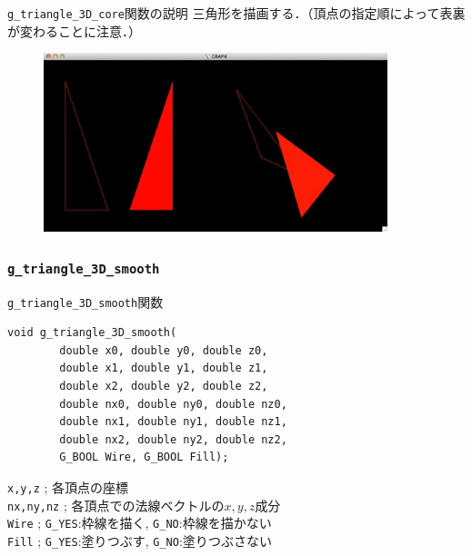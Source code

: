\documentclass[platex,a4paper,12pt]{jsarticle}%
\begin{document}
\begin{itembox}[l]{\texttt{g\_triangle\_3D\_core}関数の説明}
三角形を描画する．（頂点の指定順によって表裏が変わることに注意．）
\end{itembox}

\begin{figure}[htb]
\centering
	\includegraphics[width=100mm]{Canvas_g_triangle.eps}
\end{figure}


\clearpage
\subsubsection{\texttt{g\_triangle\_3D\_smooth}}

\begin{itembox}[l]{\texttt{g\_triangle\_3D\_smooth}関数}
\begin{verbatim}
void g_triangle_3D_smooth(
        double x0, double y0, double z0,
        double x1, double y1, double z1,
        double x2, double y2, double z2,
        double nx0, double ny0, double nz0,
        double nx1, double ny1, double nz1,
        double nx2, double ny2, double nz2,
        G_BOOL Wire, G_BOOL Fill);  
\end{verbatim}
\verb|x,y,z| ; 各頂点の座標\\
\verb|nx,ny,nz| ; 各頂点での法線ベクトルの$x,y,z$成分\\
\verb|Wire| ; \verb|G_YES|:枠線を描く, \verb|G_NO|:枠線を描かない \\
\verb|Fill| ; \verb|G_YES|:塗りつぶす, \verb|G_NO|:塗りつぶさない 
\end{itembox}
\end{document}
